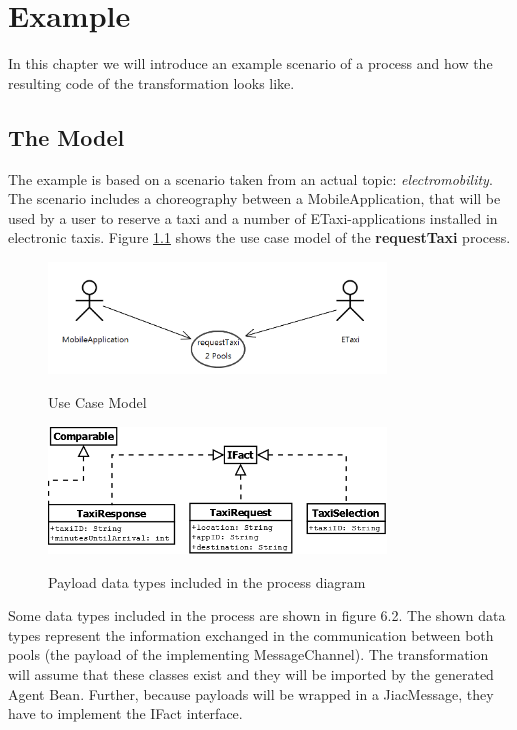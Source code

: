 \chapter{Example}
\label{chap:examples}

In this chapter we will introduce an example scenario of a process and how the resulting code of the transformation looks like.

\section{The Model}
The example is based on a scenario taken from an actual topic: \textit{electromobility}. The scenario includes a choreography between a MobileApplication, that will be used by a user to reserve a taxi and a number of ETaxi-applications installed in electronic taxis. Figure \ref{fig:usecase} shows the use case model of the \textbf{requestTaxi} process.\\

\begin{figure}[h]
	\centering
		\includegraphics[width=0.8\textwidth]{images/example/usecase.png}
	\label{fig:usecase}
	\caption{Use Case Model}
\end{figure}

\begin{figure}[h]
	\centering
		\includegraphics[width=0.8\textwidth]{images/example/payloads.png}
	\label{fig:datatypes}
	\caption{Payload data types included in the process diagram}
\end{figure}

Some data types included in the process are shown in figure 6.2. The shown data types represent the information exchanged in the communication between both pools (the payload of the implementing MessageChannel). The transformation will assume that these classes exist and they will be imported by the generated Agent Bean. Further, because payloads will be wrapped in a JiacMessage, they have to implement the IFact interface.

